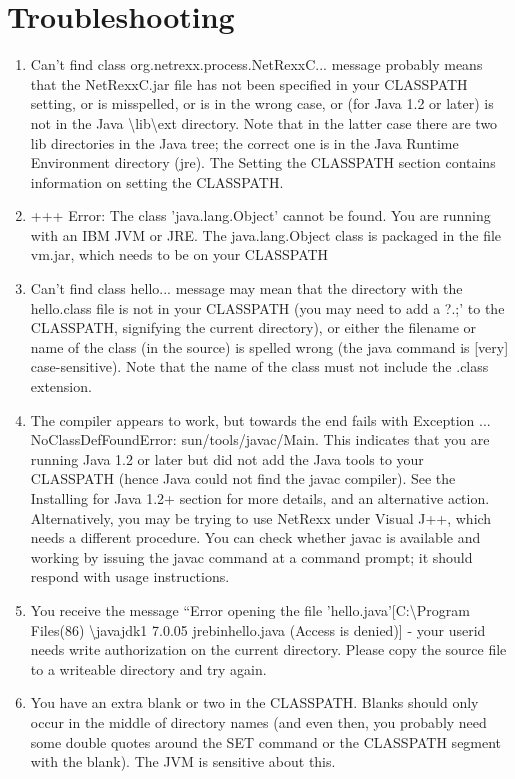 \chapter{Troubleshooting\label{troubleshooting}}
\begin{enumerate} 
\item Can't find class org.netrexx.process.NetRexxC... message
  probably means that the NetRexxC.jar file has not been specified in
  your CLASSPATH setting, or is misspelled, or is in the wrong case,
  or (for Java 1.2 or later) is not in the Java
  \textbackslash lib\textbackslash ext directory. Note that in the latter case there are two lib directories in the Java tree; the correct one is in the Java Runtime Environment directory (jre).
The Setting the CLASSPATH section contains information on setting the CLASSPATH.
\item +++ Error: The class 'java.lang.Object' cannot be found. You are running with an IBM JVM or JRE. The java.lang.Object class is packaged in the file vm.jar, which needs to be on your CLASSPATH
\item Can't find class hello... message may mean that the directory with the hello.class file is not in your CLASSPATH (you may need to add a ?.;’ to the CLASSPATH, signifying the current directory), or either the filename or name of the class (in the source) is spelled wrong (the java command is [very] case-sensitive). Note that the name of the class must not include the .class extension.
\item The compiler appears to work, but towards the end fails with Exception ... NoClassDefFoundError: sun/tools/javac/Main. This indicates that you are running Java 1.2 or later but did not add the Java tools to your CLASSPATH (hence Java could not find the javac compiler). See the Installing for Java 1.2+ section for more details, and an alternative action.
Alternatively, you may be trying to use NetRexx under Visual J++, which needs a different procedure. You can check whether javac is available and working by issuing the javac command at a command prompt; it should respond with usage instructions.
\item You receive the message ``Error opening the file 'hello.java'[C:\textbackslash Program Files(86) \textbackslash javajdk1 7.0.05 jrebinhello.java (Access is denied)] - your userid needs write authorization on the current directory. Please copy the source file to a writeable directory and try again.
\item You have an extra blank or two in the CLASSPATH. Blanks should only occur in the middle of directory names (and even then, you probably need some double quotes around the SET command or the CLASSPATH segment with the blank). The JVM is sensitive about this.

\end{enumerate}
